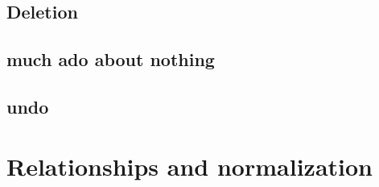 \documentclass[english,submission]{programming}
\theoremstyle{definition}
\begin{document}
\subsection{Deletion}




\subsection{much ado about nothing}



\subsection{undo}




\section{Relationships and normalization}
\end{document}
